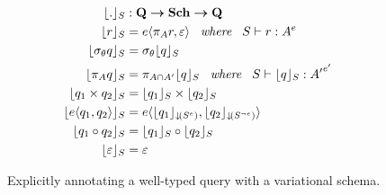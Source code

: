 \begin{figure}
\begin{alignat*}{1}
\constrain . &: \qSet \totype \vSchSet \totype \qSet\\
%
\constrain \vRel &= 
\chc [\dimMeta] {\vPrj \vRel, \empRel}
\hspace{5pt} \textit{ where } \hspace{5pt}
\envWithoutVctx   {\vRel} {\annot \vAttList}
\\
\constrain {\vSel \vQ}  &=  \vSel {\constrain \vQ}
\\
%
\constrain {\vPrj [\vAttList] \vQ} &= 
\vPrj [\vAttList \cap \VVal \vAttList] {\constrain \vQ}
\hspace{5pt} \textit{ where } \hspace{5pt}
\envWithoutVctx {{\constrain \vQ}} {\annot [\VVal \dimMeta] {\VVal \vAttList}}
\\
%
\constrain {{\vQ_1} \times {\vQ_2}} &= 
\constrain {\vQ_1} \times \constrain {\vQ_2}
\\
%
%
\constrain {\chc {\vQ_1, \vQ_2}} &= 
\chc {\constrain [\pushIn {\annot [\dimMeta] \vSch}] {\vQ_1}, \constrain [\pushIn {\annot [\neg \dimMeta] \vSch}] {\vQ_2}}
\\
%
\constrain {{\vQ_1} \circ {\vQ_2}} &= 
\constrain {\vQ_1} \circ \constrain {\vQ_2}\\
%
\constrain {\empRel} &= \empRel
\end{alignat*}
\caption[Explicitly annotating a variational query with a variational schema]{
Explicitly annotating a well-typed query with a variational schema. 
}
\label{fig:constrain}
\end{figure}
